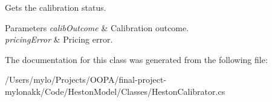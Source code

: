 Gets the calibration status. 


\begin{DoxyParams}{Parameters}
{\em calib\+Outcome} & Calibration outcome.\\
\hline
{\em pricing\+Error} & Pricing error.\\
\hline
\end{DoxyParams}


The documentation for this class was generated from the following file\+:\begin{DoxyCompactItemize}
\item 
/\+Users/mylo/\+Projects/\+O\+O\+P\+A/final-\/project-\/mylonakk/\+Code/\+Heston\+Model/\+Classes/Heston\+Calibrator.\+cs\end{DoxyCompactItemize}
